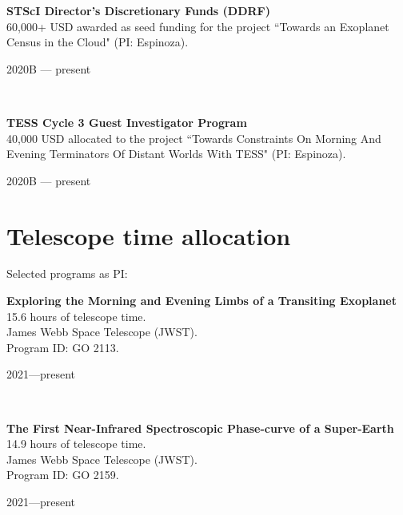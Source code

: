 \documentclass[12pt, a4paper]{article} %
\begin{document}
\begin{minipage}[t]{0.7\textwidth}
\begin{flushleft}%
  \setlength{\leftskip}{0.2cm}%
\textbf{STScI Director's Discretionary Funds (DDRF)}\\
60,000+ USD awarded as seed funding for the project ``Towards an Exoplanet Census in the Cloud" (PI: Espinoza).
\end{flushleft}
\end{minipage}
\begin{minipage}[t]{0.3\textwidth}
\hfill 2020B --- present
\end{minipage}\\

\begin{minipage}[t]{0.7\textwidth}
\begin{flushleft}%
  \setlength{\leftskip}{0.2cm}%
\textbf{TESS Cycle 3 Guest Investigator Program}\\
40,000 USD allocated to the project ``Towards Constraints On Morning And Evening Terminators Of Distant Worlds With TESS" (PI: Espinoza).
\end{flushleft}
\end{minipage}
\begin{minipage}[t]{0.3\textwidth}
\hfill 2020B --- present
\end{minipage}

\section*{Telescope time allocation}
Selected programs as PI:\\

\begin{minipage}[t]{0.7\textwidth}
\begin{flushleft}%
  \setlength{\leftskip}{0.2cm}%
\textbf{Exploring the Morning and Evening Limbs of a Transiting Exoplanet}\\
15.6 hours of telescope time.\\
James Webb Space Telescope (JWST).\\
Program ID: GO 2113.
\end{flushleft}
\end{minipage}
\begin{minipage}[t]{0.3\textwidth}
\hfill 2021---present
\end{minipage}\\


\begin{minipage}[t]{0.7\textwidth}
\begin{flushleft}%
  \setlength{\leftskip}{0.2cm}%
\textbf{The First Near-Infrared Spectroscopic Phase-curve of a Super-Earth}\\
14.9 hours of telescope time.\\
James Webb Space Telescope (JWST).\\
Program ID: GO 2159.
\end{flushleft}
\end{minipage}
\begin{minipage}[t]{0.3\textwidth}
\hfill 2021---present
\end{minipage}\\
\end{document}
